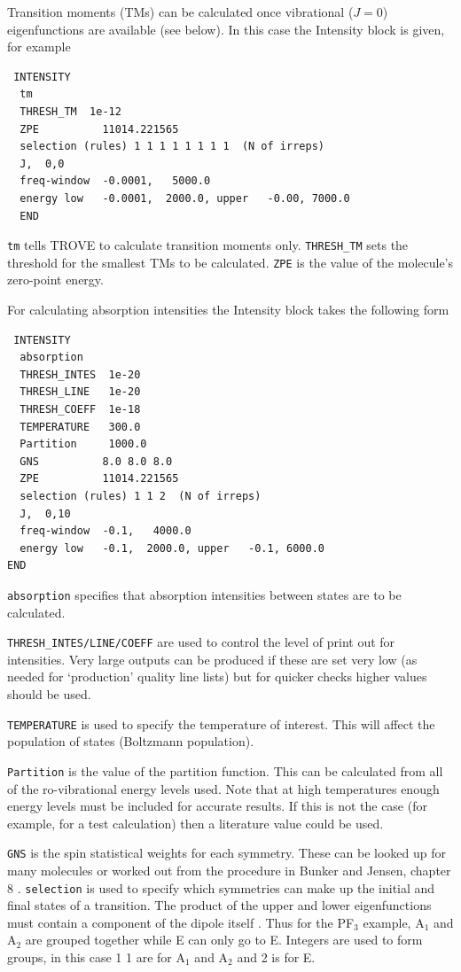 Transition moments (TMs) can be calculated once vibrational ($J=0$) eigenfunctions are available (see below). 
In this case the Intensity block is given, for example
\begin{verbatim}
 INTENSITY
  tm
  THRESH_TM  1e-12
  ZPE          11014.221565
  selection (rules) 1 1 1 1 1 1 1 1  (N of irreps)
  J,  0,0
  freq-window  -0.0001,   5000.0
  energy low   -0.0001,  2000.0, upper   -0.00, 7000.0
  END
\end{verbatim}
\verb|tm| tells TROVE to calculate transition moments only. \verb|THRESH_TM| sets the threshold for the smallest
TMs to be calculated.
\verb|ZPE| is the value of the molecule's zero-point energy. 


For calculating absorption intensities the Intensity block takes the following form
\begin{verbatim}
 INTENSITY
  absorption
  THRESH_INTES  1e-20
  THRESH_LINE   1e-20
  THRESH_COEFF  1e-18
  TEMPERATURE   300.0
  Partition     1000.0
  GNS          8.0 8.0 8.0
  ZPE          11014.221565
  selection (rules) 1 1 2  (N of irreps)
  J,  0,10
  freq-window  -0.1,   4000.0
  energy low   -0.1,  2000.0, upper   -0.1, 6000.0
END
\end{verbatim}
\verb|absorption| specifies that absorption intensities between states are to be calculated.


\verb|THRESH_INTES/LINE/COEFF| are used to control the level of print out for intensities. Very large outputs
can be produced if these are set very low (as needed for `production' quality line lists) but for 
quicker checks higher values should be used.


\verb|TEMPERATURE| is used to specify the temperature of interest. This will affect the population of states 
(Boltzmann population).


\verb|Partition| is the value of the partition function. 
This can be calculated from all of the ro-vibrational energy levels used. 
Note that at high temperatures enough energy levels must be included for accurate results. 
If this is not the case (for example, for a test calculation) then a literature value could be used.


\verb|GNS| is the spin statistical weights for each symmetry. 
These can be looked up for many molecules or worked out from the procedure in Bunker and Jensen, chapter 8 \cite{98BuJexx}.
\verb|selection| is used to specify which symmetries can make up the initial and final states of a transition.
The product of the upper and lower eigenfunctions must contain a component of the dipole itself \cite{98BuJexx}. Thus for the PF$_3$
example, A$_1$ and A$_2$ are grouped together while E can only go to E. Integers are used to form groups, in this case
1 1 are for A$_1$ and A$_2$ and 2 is for E.


